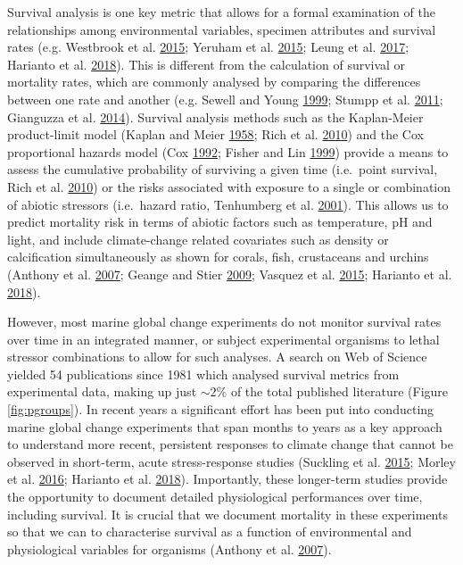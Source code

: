 \documentclass[a4paper,10pt, oneside]{memoir}
\begin{document}
Survival analysis is one key metric that allows for a formal examination of the relationships among environmental variables, specimen attributes and survival rates (e.g. Westbrook et al. \protect\hyperlink{ref-Westbrook2015}{2015}; Yeruham et al. \protect\hyperlink{ref-Yeruham2015}{2015}; Leung et al. \protect\hyperlink{ref-Leung2017}{2017}; Harianto et al. \protect\hyperlink{ref-Harianto2018}{2018}).
This is different from the calculation of survival or mortality rates, which are commonly analysed by comparing the differences between one rate and another (e.g. Sewell and Young \protect\hyperlink{ref-Sewell1999}{1999}; Stumpp et al. \protect\hyperlink{ref-Stumpp2011}{2011}; Gianguzza et al. \protect\hyperlink{ref-Gianguzza2014}{2014}).
Survival analysis methods such as the Kaplan-Meier product-limit model (Kaplan and Meier \protect\hyperlink{ref-Kaplan1958}{1958}; Rich et al. \protect\hyperlink{ref-Rich2010}{2010}) and the Cox proportional hazards model (Cox \protect\hyperlink{ref-Cox1992}{1992}; Fisher and Lin \protect\hyperlink{ref-Fisher1999}{1999}) provide a means to assess the cumulative probability of surviving a given time (i.e.~point survival, Rich et al. \protect\hyperlink{ref-Rich2010}{2010}) or the risks associated with exposure to a single or combination of abiotic stressors (i.e.~hazard ratio, Tenhumberg et al. \protect\hyperlink{ref-Tenhumberg2001}{2001}).
This allows us to predict mortality risk in terms of abiotic factors such as temperature, pH and light, and include climate-change related covariates such as density or calcification simultaneously as shown for corals, fish, crustaceans and urchins (Anthony et al. \protect\hyperlink{ref-Anthony2007}{2007}; Geange and Stier \protect\hyperlink{ref-Geange2009}{2009}; Vasquez et al. \protect\hyperlink{ref-Vasquez2015}{2015}; Harianto et al. \protect\hyperlink{ref-Harianto2018}{2018}).

However, most marine global change experiments do not monitor survival rates over time in an integrated manner, or subject experimental organisms to lethal stressor combinations to allow for such analyses.
A search on Web of Science yielded 54 publications since 1981 which analysed survival metrics from experimental data, making up just \(\sim 2\%\) of the total published literature (Figure \ref{fig:pgroups}).
In recent years a significant effort has been put into conducting marine global change experiments that span months to years as a key approach to understand more recent, persistent responses to climate change that cannot be observed in short-term, acute stress-response studies (Suckling et al. \protect\hyperlink{ref-Suckling2015}{2015}; Morley et al. \protect\hyperlink{ref-Morley2016}{2016}; Harianto et al. \protect\hyperlink{ref-Harianto2018}{2018}).
Importantly, these longer-term studies provide the opportunity to document detailed physiological performances over time, including survival.
It is crucial that we document mortality in these experiments so that we can to characterise survival as a function of environmental and physiological variables for organisms (Anthony et al. \protect\hyperlink{ref-Anthony2007}{2007}).
\end{document}
